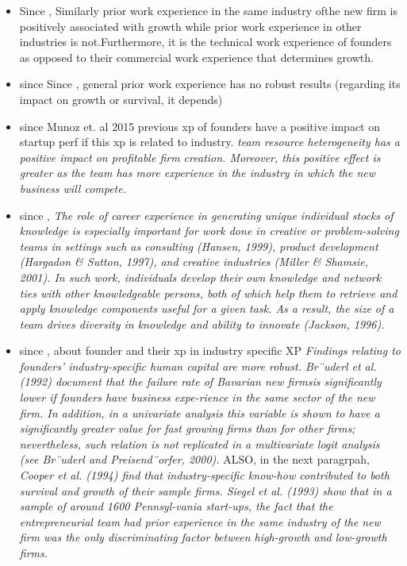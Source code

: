 \begin{itemize}
\begin{itemize}
\begin{itemize}
  \item Since \citet{colombo2005founders}, Similarly prior work experience in the same industry ofthe new firm is positively associated with growth while prior work experience in other industries is not.Furthermore, it is the technical work experience of founders as opposed to their commercial work experience that determines growth.
  \item since Since \citet{colombo2005founders}, general prior work experience has no robust results (regarding its impact on growth or survival, it depends)
  \item since Munoz et. al 2015 previous xp of founders have a positive impact on startup perf if this xp is related to industry. \textit{team resource heterogeneity has a positive impact on profitable firm creation. Moreover, this positive effect is greater as the team has more experience in the industry in which the new business will compete.}
  \item since \citet{taylor2006superman}, \textit{The role of career experience in generating unique individual stocks of knowledge is especially important for work done in creative or problem-solving teams in settings such as consulting (Hansen, 1999), product development (Hargadon & Sutton, 1997), and creative industries (Miller & Shamsie, 2001). In such work, individuals develop their own knowledge and network ties with other knowledgeable persons, both of which help them to retrieve and apply knowledge components useful for a given task. As a result, the size of a team drives diversity in knowledge and ability to innovate (Jackson, 1996).}
  \item since \citet{colombo2005founders}, about founder and their xp in industry specific XP \textit{Findings relating to founders’ industry-specific human capital are more robust. Br¨uderl et al. (1992) document that the failure rate of Bavarian new firmsis significantly lower if founders have business expe-rience in the same sector of the new firm. In addition, in a univariate analysis this variable is shown to have a significantly greater value for fast growing firms than for other firms; nevertheless, such relation is not replicated in a multivariate logit analysis (see Br¨uderl and Preisend¨orfer, 2000).} ALSO, in the next paragrpah, \textit{Cooper et al. (1994) find that industry-specific know-how contributed to both survival and growth of their sample firms. Siegel et al. (1993) show that in a sample of around 1600 Pennsyl-vania start-ups, the fact that the entrepreneurial team had prior experience in the same industry of the new firm was the only discriminating factor between high-growth and low-growth firms.}
  \\


\end{itemize}
\end{itemize}
\end{itemize}
